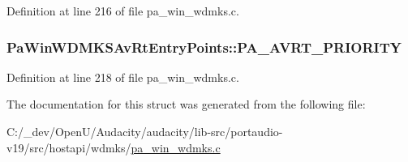 Definition at line 216 of file pa\+\_\+win\+\_\+wdmks.\+c.

\subsubsection[{\texorpdfstring{P\+A\+\_\+\+A\+V\+R\+T\+\_\+\+P\+R\+I\+O\+R\+I\+TY}{PA_AVRT_PRIORITY}}]{\setlength{\rightskip}{0pt plus 5cm}Pa\+Win\+W\+D\+M\+K\+S\+Av\+Rt\+Entry\+Points\+::\+P\+A\+\_\+\+A\+V\+R\+T\+\_\+\+P\+R\+I\+O\+R\+I\+TY}\hypertarget{struct_pa_win_w_d_m_k_s_av_rt_entry_points_a5852d421e90994f3266f994420047009}{}\label{struct_pa_win_w_d_m_k_s_av_rt_entry_points_a5852d421e90994f3266f994420047009}


Definition at line 218 of file pa\+\_\+win\+\_\+wdmks.\+c.



The documentation for this struct was generated from the following file\+:\begin{DoxyCompactItemize}
\item 
C\+:/\+\_\+dev/\+Open\+U/\+Audacity/audacity/lib-\/src/portaudio-\/v19/src/hostapi/wdmks/\hyperlink{pa__win__wdmks_8c}{pa\+\_\+win\+\_\+wdmks.\+c}\end{DoxyCompactItemize}
